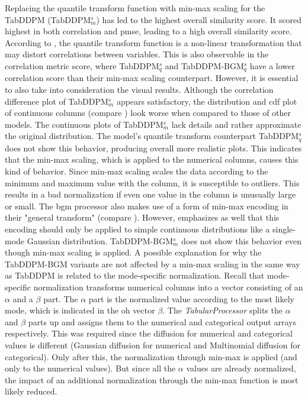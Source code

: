 Replacing the quantile transform function with min-max scaling for the TabDDPM (TabDDPM$^{s}_m$) has led to the highest overall similarity score.
It scored highest in both correlation and \gls{pmse}, leading to a high overall similarity score.
According to \cite{scikit-learndevelopers2023QuantileTransformer}, the quantile transform function is a non-linear transformation that may distort correlations between variables.
This is also observable in the correlation metric score, where TabDDPM$^{s}_q$ and TabDDPM-BGM$^{s}_q$ have a lower correlation score than their min-max scaling counterpart.
However, it is essential to also take into consideration the visual results.
Although the correlation difference plot of TabDDPM$^{s}_m$ appears satisfactory, the distribution and \gls{cdf} plot of continuous columns (compare ) look worse when compared to those of other models.
The continuous plots of TabDDPM$^{s}_m$ lack details and rather approximate the original distribution.
The \gls{model}'s quantile transform counterpart TabDDPM$^{s}_q$ does not show this behavior, producing overall more realistic plots.
This indicates that the min-max scaling, which is applied to the numerical columns, causes this kind of behavior.
Since min-max scaling scales the data according to the minimum and maximum value with the column, it is susceptible to outliers.
This results in a bad normalization if even one value in the column is unusually large or small.
The \gls{bgm} processor also makes use of a form of min-max encoding in their "general transform" \cite[p. 7]{zhao2022CTABGANEnhancingTabular} (compare ).
However, \textcite{zhao2022CTABGANEnhancingTabular} emphasizes as well that this encoding should only be applied to simple continuous distributions like a single-mode Gaussian distribution.
TabDDPM-BGM$^{s}_m$ does not show this behavior even though min-max scaling is applied.
A possible explanation for why the TabDDPM-BGM variants are not affected by a min-max scaling in the same way as TabDDPM is related to the mode-specific normalization.
Recall that mode-specific normalization transforms numerical columns into a vector consisting of an $\alpha$ and a $\beta$ part.
The $\alpha$ part is the normalized value according to the most likely mode, which is indicated in the \gls{oh} vector $\beta$.
The \textit{TabularProcessor} splits the $\alpha$ and $\beta$ parts up and assigns them to the numerical and categorical output arrays respectively.
This was required since the diffusion for numerical and categorical values is different (Gaussian diffusion for numerical and Multinomial diffusion for categorical).
Only after this, the normalization through min-max is applied (and only to the numerical values). 
But since all the $\alpha$ values are already normalized, the impact of an additional normalization through the min-max function is most likely reduced.

